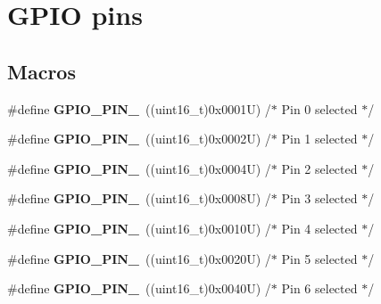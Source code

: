 \hypertarget{group___g_p_i_o__pins}{}\section{G\+P\+IO pins}
\label{group___g_p_i_o__pins}
\subsection*{Macros}
\begin{DoxyCompactItemize}
\item 
\mbox{\label{group___g_p_i_o__pins_ga176efbf43a259b7bb0a85a47401505be}} 
\#define {\bfseries G\+P\+I\+O\+\_\+\+P\+I\+N\+\_}~((uint16\+\_\+t)0x0001\+U)  /$\ast$ Pin 0 selected    $\ast$/
\item 
\mbox{\label{group___g_p_i_o__pins_ga6c35af4e75c3cb57bb650feaa7a136b5}} 
\#define {\bfseries G\+P\+I\+O\+\_\+\+P\+I\+N\+\_}~((uint16\+\_\+t)0x0002\+U)  /$\ast$ Pin 1 selected    $\ast$/
\item 
\mbox{\label{group___g_p_i_o__pins_ga6eee38b797a7268f04357dfa2759efd2}} 
\#define {\bfseries G\+P\+I\+O\+\_\+\+P\+I\+N\+\_}~((uint16\+\_\+t)0x0004\+U)  /$\ast$ Pin 2 selected    $\ast$/
\item 
\mbox{\label{group___g_p_i_o__pins_gadcaf899c018a0dde572b5af783565c62}} 
\#define {\bfseries G\+P\+I\+O\+\_\+\+P\+I\+N\+\_}~((uint16\+\_\+t)0x0008\+U)  /$\ast$ Pin 3 selected    $\ast$/
\item 
\mbox{\label{group___g_p_i_o__pins_gab3871e35868deecd260e586ad70d4b83}} 
\#define {\bfseries G\+P\+I\+O\+\_\+\+P\+I\+N\+\_}~((uint16\+\_\+t)0x0010\+U)  /$\ast$ Pin 4 selected    $\ast$/
\item 
\mbox{\label{group___g_p_i_o__pins_ga01cc9ed93f6fd12fd3403362779aaa18}} 
\#define {\bfseries G\+P\+I\+O\+\_\+\+P\+I\+N\+\_}~((uint16\+\_\+t)0x0020\+U)  /$\ast$ Pin 5 selected    $\ast$/
\item 
\mbox{\label{group___g_p_i_o__pins_ga9089f18f20ec88ee38ce6f27389e6d7e}} 
\#define {\bfseries G\+P\+I\+O\+\_\+\+P\+I\+N\+\_}~((uint16\+\_\+t)0x0040\+U)  /$\ast$ Pin 6 selected    $\ast$/

\end{DoxyCompactItemize}
